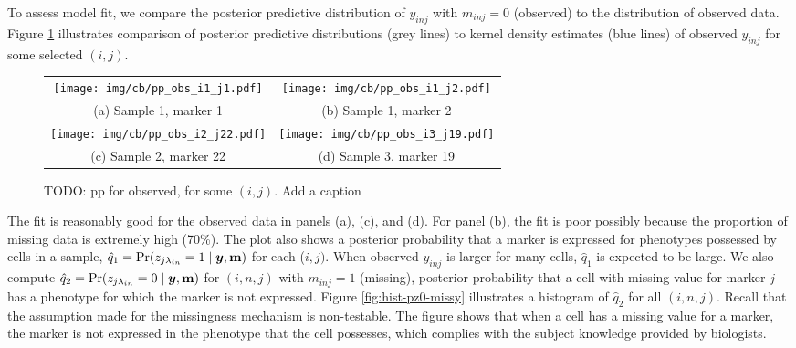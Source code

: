 \documentclass[12pt,]{article}
\def\Prob{\text{Pr}}
\newcommand{\by}{\mbox{\boldmath $y$}}
\begin{document}


To assess model fit, we compare the posterior predictive distribution of
$y_{inj}$ with $m_{inj}=0$ (observed) to the distribution of observed data.
Figure \ref{fig:cb-pp-obs-some} illustrates comparison of posterior predictive
distributions (grey lines) to kernel density estimates (blue lines) of observed
$y_{inj}$ for some selected $(i,j)$.
\begin{figure}%
\begin{center}
  \begin{tabular}{cc}
  \texttt{[image: img/cb/pp\_obs\_i1\_j1.pdf]}&
  \texttt{[image: img/cb/pp\_obs\_i1\_j2.pdf]}\\
  {\small (a) Sample 1, marker 1} & {\small (b) Sample 1, marker 2} \\
  \texttt{[image: img/cb/pp\_obs\_i2\_j22.pdf]}&
  \texttt{[image: img/cb/pp\_obs\_i3\_j19.pdf]}\\
  {\small (c) Sample 2, marker 22} & {\small (d) Sample 3, marker 19} \\
  \end{tabular}
\end{center}
\vspace{-0.05in}
\caption{TODO: pp for observed, for some $(i,j)$. Add a caption}
\label{fig:cb-pp-obs-some}
\end{figure}
The fit is reasonably good for the observed data in panels (a), (c), and (d).
For panel (b), the fit is poor possibly because the proportion of missing data
is extremely high (70\%).  The plot also shows a posterior probability that a
marker is expressed for phenotypes possessed by cells in a sample,
$\hat{q}_1=\Prob(z_{j \lambda_{in}}=1 \mid \by, \bf m)$ for each ($i,j)$. When
observed $y_{inj}$ is larger for many cells, $\hat{q}_1$ is expected to be
large.  We also compute $\hat{q}_2=\Prob(z_{j \lambda_{in}}=0 \mid \by, \bf m)$
for $(i,n,j)$ with $m_{inj}=1$ (missing), posterior probability that a cell
with missing value for marker $j$ has a phenotype for which the marker is not
expressed.  Figure \ref{fig:hist-pz0-missy} illustrates a histogram of
$\hat{q}_2$ for all $(i, n, j)$.  Recall that the assumption made for the
missingness mechanism is non-testable.   The figure shows that when a cell has
a missing value for a marker, the marker is not expressed in the phenotype that
the cell possesses, which complies with the subject knowledge provided by
biologists. 
\end{document}
